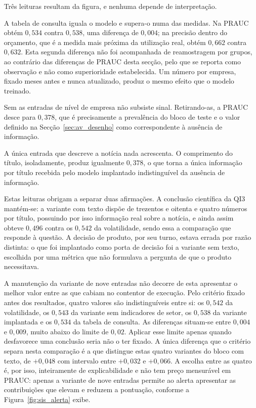 Três leituras resultam da figura, e nenhuma depende de interpretação.

A tabela de consulta iguala o modelo e supera-o numa das medidas. Na \gls{PRAUC} obtém $0{,}534$
contra $0{,}538$, uma diferença de $0{,}004$; na precisão dentro do orçamento, que é a medida mais
próxima da utilização real, obtém $0{,}662$ contra $0{,}632$. Esta segunda diferença não foi
acompanhada de reamostragem por grupos, ao contrário das diferenças de \gls{PRAUC} desta secção, pelo
que se reporta como observação e não como superioridade estabelecida. Um número por empresa, fixado
meses antes e nunca atualizado, produz o mesmo efeito que o modelo treinado.

Sem as entradas de nível de empresa não subsiste sinal. Retirando-as, a \gls{PRAUC} desce para
$0{,}378$, que é precisamente a prevalência do bloco de teste e o valor definido na
Secção~\ref{sec:av_desenho} como correspondente à ausência de informação.

A única entrada que descreve a notícia nada acrescenta. O comprimento do título, isoladamente,
produz igualmente $0{,}378$, o que torna a única informação por título recebida pelo modelo
implantado indistinguível da ausência de informação.

Estas leituras obrigam a separar duas afirmações. A conclusão científica da \gls{QI}3 mantém-se: a
variante com texto dispõe de trezentos e oitenta e quatro números por título, possuindo por isso
informação real sobre a notícia, e ainda assim obteve $0{,}496$ contra os $0{,}542$ da volatilidade,
sendo essa a comparação que responde à questão. A decisão de produto, por seu turno, estava errada
por razão distinta: o que foi implantado como porta de decisão foi a variante sem texto, escolhida
por uma métrica que não formulava a pergunta de que o produto necessitava.

A manutenção da variante de nove entradas não decorre de esta apresentar o melhor valor entre as que
cabiam no contentor de execução. Pelo critério fixado antes dos resultados, quatro valores são indistinguíveis entre si: os
$0{,}542$ da volatilidade, os $0{,}543$ da variante sem indicadores de setor, os $0{,}538$ da
variante implantada e os $0{,}534$ da tabela de consulta. As diferenças situam-se entre $0{,}004$
e $0{,}009$, muito abaixo do limite de $0{,}02$. Aplicar esse limite apenas quando desfavorece uma
conclusão seria não o ter fixado. A única diferença que o
critério separa nesta comparação é a que distingue estas quatro variantes do bloco com texto, de
$+0{,}048$ com intervalo entre $+0{,}032$ e $+0{,}066$. A escolha entre as quatro é, por isso,
inteiramente de explicabilidade e não tem preço mensurável em \gls{PRAUC}: apenas a variante de nove
entradas permite ao alerta apresentar as contribuições que elevam e reduzem a pontuação, conforme a
Figura~\ref{fig:sis_alerta} exibe.

